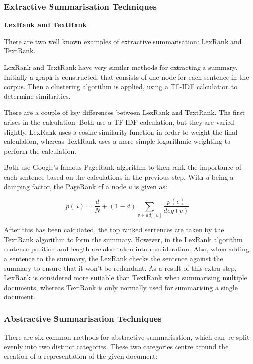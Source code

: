 \documentclass[12pt]{article}
\begin{document}
\subsubsection{Extractive Summarisation Techniques}

\label{extractiveSummarisation}

\textbf{LexRank and TextRank}

There are two well known examples of extractive summarisation: LexRank and TextRank.

LexRank and TextRank have very similar methods for extracting a summary\cite{lexRank}. Initially a graph is constructed, that consists of one node for each sentence in the corpus. Then a clustering algorithm is applied, using a TF-IDF calculation to determine similarities. 

There are a couple of key differences between LexRank and TextRank. The first arises in the calculation. Both use a TF-IDF calculation, but they are varied slightly. LexRank uses a cosine similarity function in order to weight the final calculation, whereas TextRank uses a more simple logarithmic weighting to perform the calculation. 

Both use Google's famous PageRank algorithm to then rank the importance of each sentence based on the calculations in the previous step. With \emph{d} being a damping factor, the PageRank of a node \emph{u} is given as:

\[p(u) = \frac{d}{N} + (1-d)\sum_{v \in adj[u]}\frac{p(v)}{deg(v)} \] 

After this has been calculated, the top ranked sentences are taken by the TextRank algorithm to form the summary. However, in the LexRank algorithm sentence position and length are also taken into consideration. Also, when adding a sentence to the summary, the LexRank checks the sentence against the summary to ensure that it won't be redundant. As a result of this extra step, LexRank is considered more suitable than TextRank when summarising multiple documents, whereas TextRank is only normally used for summarising a single document.

\subsubsection{Abstractive Summarisation Techniques}

There are six common methods for abstractive summarisation, which can be split evenly into two distinct categories\cite{abstractiveTechniques}. These two categories centre around the creation of a representation of the given document: \\
\end{document}
